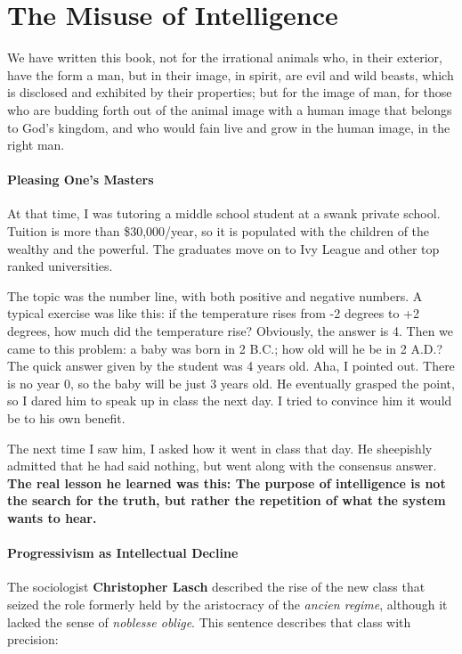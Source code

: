 \section{The Misuse of Intelligence}

\begin{quotex}
We have written this book, not for the irrational animals who, in their exterior, have the form a man, but in their image, in spirit, are evil and wild beasts, which is disclosed and exhibited by their properties; but for the image of man, for those who are budding forth out of the animal image with a human image that belongs to God's kingdom, and who would fain live and grow in the human image, in the right man. 

\end{quotex}
\paragraph{Pleasing One's Masters}
At that time, I was tutoring a middle school student at a swank private school. Tuition is more than \$30,000/year, so it is populated with the children of the wealthy and the powerful. The graduates move on to Ivy League and other top ranked universities.

The topic was the number line, with both positive and negative numbers. A typical exercise was like this: if the temperature rises from -2 degrees to +2 degrees, how much did the temperature rise? Obviously, the answer is 4. Then we came to this problem: a baby was born in 2 B.C.; how old will he be in 2 A.D.? The quick answer given by the student was 4 years old. Aha, I pointed out. There is no year 0, so the baby will be just 3 years old. He eventually grasped the point, so I dared him to speak up in class the next day. I tried to convince him it would be to his own benefit.

The next time I saw him, I asked how it went in class that day. He sheepishly admitted that he had said nothing, but went along with the consensus answer. \textbf{The real lesson he learned was this: The purpose of intelligence is not the search for the truth, but rather the repetition of what the system wants to hear.}

\paragraph{Progressivism as Intellectual Decline}
The sociologist \textbf{Christopher Lasch} described the rise of the new class that seized the role formerly held by the aristocracy of the \emph{ancien regime}, although it lacked the sense of \emph{noblesse oblige}. This sentence describes that class with precision:

